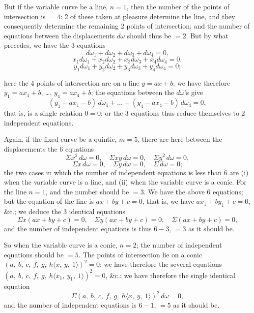 \documentclass[11pt,a4paper]{article}
\providecommand{\textsc}[1]{{\scshape #1}}
\begin{document}
\medskip
But if the variable curve be a line, $n = 1$, then the number of the points of intersection is $= 4$: 2 of these taken at pleasure determine the line, and they consequently determine the remaining 2 points of intersection; and the number of equations between the displacements $d\omega$ should thus be $= 2$.  But by what precedes, we have the 3 equations
\[
d\omega_{1} + d\omega_{2} + d\omega_{3} + d\omega_{4} = 0,
\]
\[
x_{1}d\omega_{1} + x_{2}d\omega_{2} + x_{3}d\omega_{3} + x_{4}d\omega_{4} = 0,
\]
\[
y_{1}d\omega_{1} + y_{2}d\omega_{2} + y_{3}d\omega_{3} + y_{4}d\omega_{4} = 0;
\]
\clearpage

\fancyhead[L]{\small 805]}
\fancyhead[C]{\small\textsc{note on abel's theorem.}}

\thispagestyle{plain}
\noindent here the 4 points of intersection are on a line $y = ax + b$; we have therefore $y_{1} = ax_{1} + b$, \ldots, $y_{4} = ax_{4} + b$; the equations between the $d\omega$'s give
\[
(y_{1} - ax_{1} - b)\,d\omega_{1} + \ldots + (y_{4} - ax_{4} - b)\,d\omega_{4} = 0,
\]
that is, is a single relation $0 = 0$; or the 3 equations thus reduce themselves to 2 independent equations.

\medskip
Again, if the fixed curve be a quintic, $m = 5$, there are here between the displacements the 6 equations
\[
\Sigma x^{2}\,d\omega = 0,\quad \Sigma xy\,d\omega = 0,\quad \Sigma y^{2}\,d\omega = 0,
\]
\[
\Sigma x\,d\omega = 0,\quad \Sigma y\,d\omega = 0,\quad \Sigma\,d\omega = 0;
\]
the two cases in which the number of independent equations is less than 6 are (i) when the variable curve is a line, and (ii) when the variable curve is a conic.  For the line $n = 1$, and the number should be $= 3$.  We have the above 6 equations; but the equation of the line is $ax + by + c = 0$, that is, we have $ax_{1} + by_{1} + c = 0$, \&c.; we deduce the 3 identical equations
\[
\Sigma x(ax + by + c) = 0,\quad \Sigma y(ax + by + c) = 0,\quad \Sigma(ax + by + c) = 0,
\]
and the number of independent equations is thus $6 - 3$, $= 3$ as it should be.

\medskip
So when the variable curve is a conic, $n = 2$; the number of independent equations should be $= 5$.  The points of intersection lie on a conic $(a,\ b,\ c,\ f,\ g,\ h\langle x,\ y,\ 1\rangle)^{2} = 0$; we have therefore the several equations $(a,\ b,\ c,\ f,\ g,\ h\langle x_{1},\ y_{1},\ 1\rangle)^{2} = 0$, \&c.: we have therefore the single identical equation
\[
\Sigma(a,\ b,\ c,\ f,\ g,\ h\langle x,\ y,\ 1\rangle)^{2}\,d\omega = 0,
\]
and the number of independent equations is $6 - 1$, $= 5$ as it should be.
\end{document}
